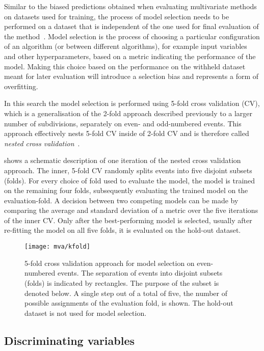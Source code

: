 Similar to the biased predictions obtained when evaluating
multivariate methods on datasets used for training, the process of
model selection needs to be performed on a dataset that is independent
of the one used for final evaluation of the
method~\cite{cawley10}. Model selection is the process of choosing a
particular configuration of an algorithm (or between different
algorithms), for example input variables and other hyperparameters,
based on a metric indicating the performance of the model. Making this
choice based on the performance on the withheld dataset meant for
later evaluation will introduce a selection bias and represents a form
of overfitting.

In this search the model selection is performed using 5-fold cross
validation (CV), which is a generalisation of the 2-fold approach
described previously to a larger number of subdivisions, separately on
even- and odd-numbered events. This approach effectively nests
5-fold CV inside of 2-fold CV and is therefore called
\emph{nested cross validation}~\cite{cawley10,stone74}.

 shows a schematic description of one
iteration of the nested cross validation approach. The inner,
5-fold CV randomly splits events into five disjoint subsets
(folds). For every choice of fold used to evaluate the model, the
model is trained on the remaining four folds, subsequently evaluating
the trained model on the evaluation-fold. A decision between two
competing models can be made by comparing the average and standard
deviation of a metric over the five iterations of the inner CV. Only
after the best-performing model is selected, usually after re-fitting
the model on all five folds, it is evaluated on the hold-out dataset.

\begin{figure}[htbp]
  \centering

  \texttt{[image: mva/kfold]}

  \caption{5-fold cross validation approach for model selection on
    even-numbered events. The separation of events into disjoint
    subsets (folds) is indicated by rectangles. The purpose of the
    subset is denoted below. A single step out of a total of five, the
    number of possible assignments of the evaluation fold, is
    shown. The hold-out dataset is not used for model selection.}
  \label{fig:cross_validation}
\end{figure}


\subsection{Discriminating variables}
\label{sec:mva_discriminating variables}


